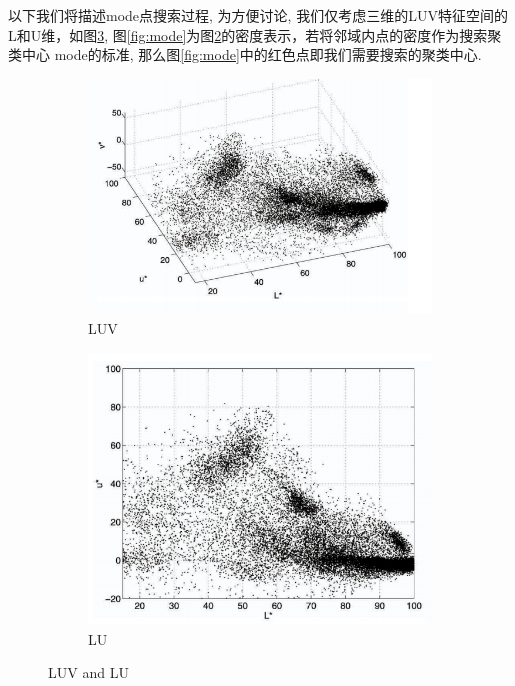 \documentclass[a4paper, 11pt]{article}
\begin{document}
以下我们将描述mode点搜索过程, 为方便讨论, 我们仅考虑三维的LUV特征空间的L和U维，如图\ref{fig:luv lu},
图\ref{fig:mode}为图\ref{fig:lu}的密度表示，若将邻域内点的密度作为搜索聚类中心
mode的标准, 那么图\ref{fig:mode}中的红色点即我们需要搜索的聚类中心.

\begin{figure}
    \centering
    \begin{subfigure}[b]{0.4\textwidth}
        \centering
        \includegraphics[width=\textwidth]{images/luv.png}
        \caption{LUV}
        \label{fig:luv}
    \end{subfigure}
    \hfill
    \begin{subfigure}[b]{0.4\textwidth}
        \centering
        \includegraphics[width=\textwidth]{images/lu.png}
        \caption{LU}
        \label{fig:lu}
    \end{subfigure}
\caption{LUV and LU}
\label{fig:luv lu}
\end{figure}
\end{document}
